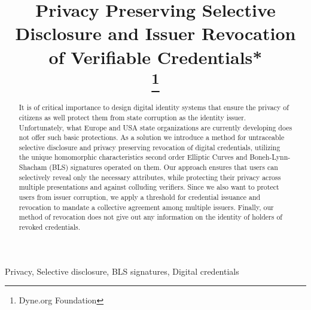 \documentclass[conference]{IEEEtran}
\begin{document}
\title{Privacy Preserving Selective Disclosure and Issuer Revocation of Verifiable Credentials*\\
\thanks{Dyne.org Foundation}
}

\author{
\and
{}
}

\maketitle

\begin{abstract}

It is of critical importance to design digital identity systems that
ensure the privacy of citizens as well protect them from state
corruption as the identity issuer. Unfortunately, what Europe and USA
state organizations are currently developing does not offer such basic
protections. As a solution we introduce a method for untraceable
selective disclosure and privacy preserving revocation of digital
credentials, utilizing the unique homomorphic characteristics second
order Elliptic Curves and Boneh-Lynn-Shacham (BLS) signatures operated
on them. Our approach ensures that users can selectively reveal only
the necessary attributes, while protecting their privacy across
multiple presentations and against colluding verifiers. Since we also
want to protect users from issuer corruption, we apply a threshold for
credential issuance and revocation to mandate a collective agreement
among multiple issuers. Finally, our method of revocation does not
give out any information on the identity of holders of revoked
credentials.

\end{abstract}

\begin{IEEEkeywords}
Privacy, Selective disclosure, BLS signatures, Digital credentials
\end{IEEEkeywords}
\end{document}
